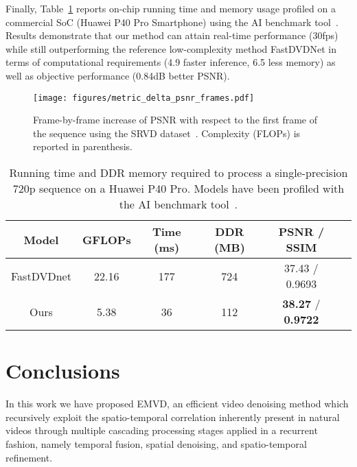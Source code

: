 \documentclass[final]{cvpr}
\newcommand{\textapprox}{}
\begin{document}
    \indent Finally, Table~\ref{tab:soc_profiling} reports on-chip running time and memory usage profiled on a commercial SoC (Huawei P40 Pro Smartphone) using the AI benchmark tool~\cite{ignatov2019ai}. Results demonstrate that our method can attain real-time performance (\textapprox30fps) while still outperforming the reference low-complexity method FastDVDNet in terms of computational requirements (4.9 faster inference, 6.5 less memory) as well as objective performance (0.84dB better PSNR).
    

    \begin{figure}[t!]
        \centering
        \texttt{[image: figures/metric\_delta\_psnr\_frames.pdf]}
        \vspace{-0.1cm}
        \caption{Frame-by-frame increase of PSNR with respect to the first frame of the sequence using the SRVD dataset~\cite{chen2018sid,yue2020supervised}. Complexity (FLOPs) is reported in parenthesis.}
        \label{fig:psnr_frames}
        \vspace{0.2cm}
    \end{figure}
    
    \begin{table}[t]
        \centering
        \small
        \setlength{\tabcolsep}{1.75pt}
        \begin{tabular}{cccccc}
            \hline
            Model                & GFLOPs & Time (ms)& DDR (MB) & PSNR / SSIM                      \\
            \hline \hline
            FastDVDnet & 22.16  & 177      & 724      & 37.43 / 0.9693                   \\        
            \rowcolor{LightYellow}
            Ours                 & 5.38   & 36       & 112      & \textbf{38.27} / \textbf{0.9722} \\
         \hline
        \end{tabular}
        \caption{Running time and DDR memory required to process a single-precision 720p sequence on a Huawei P40 Pro. Models have been profiled with the AI benchmark tool~\cite{ignatov2019ai}.}
        \label{tab:soc_profiling}
    \end{table}

  
    \section{Conclusions}
    \label{section:conclusion}

    In this work we have proposed EMVD, an efficient video denoising method which recursively exploit the spatio-temporal correlation inherently present in natural videos through multiple cascading processing stages applied in a recurrent fashion, namely temporal fusion, spatial denoising, and spatio-temporal refinement.
\end{document}

